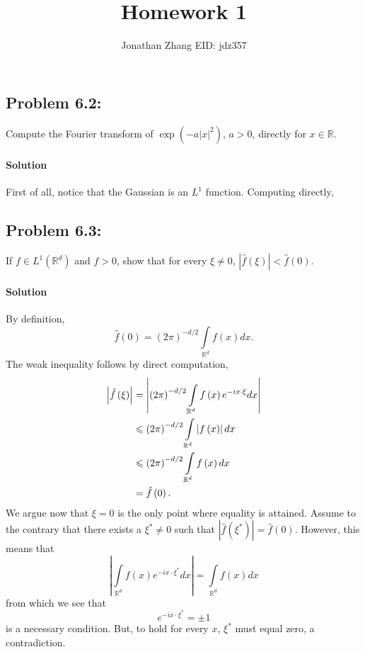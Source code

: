 \documentclass[letterpaper,twoside,11pt]{article}
\theoremstyle{mystyle}
\newcommand{\R}{{\mathbb R}}
\begin{document}
\title{\vspace{-2\baselineskip} 
Homework 1
}
\author{Jonathan Zhang \qquad EID: { jdz357} }
\date{}
\maketitle


\subsection*{Problem 6.2:}
Compute the Fourier transform of $\exp\left( -a| x| ^2 \right)$, $a>0$, directly for $x\in \R$.

\paragraph*{Solution} 
First of all, notice that the Gaussian is an $L^1$ function. 
Computing directly,


\subsection*{Problem 6.3:}
If $f\in L^1\left( \R^d \right)$ and $f>0$, show that for every $\xi\neq 0$, $\left\vert \hat f \left( \xi \right) \right\vert< \hat f\left( 0 \right)$. 

\paragraph*{Solution} By definition, 
\[\hat f\left( 0 \right) = {\left( {2\pi } \right)^{ - d/2}}\int\limits_{{\mathbb{R}^d}} {f\left( x \right)dx} .\]
The weak inequality follows by direct computation, 
\begin{align*}
  \left| {\hat f\left( \xi  \right)} \right| &= \left| {{{\left( {2\pi } \right)}^{ - d/2}}\int\limits_{{\mathbb{R}^d}} {f\left( x \right){e^{ - ix \cdot \xi }}dx} } \right| \hfill \\
   &\leqslant {\left( {2\pi } \right)^{ - d/2}}\int\limits_{{\mathbb{R}^d}} {\left| {f\left( x \right)} \right|dx}  \hfill \\
   &\leqslant {\left( {2\pi } \right)^{ - d/2}}\int\limits_{{\mathbb{R}^d}} {f\left( x \right)dx}  \hfill \\
   &= \hat f\left( 0 \right) .
\end{align*}
  We argue now that $\xi = 0$ is the only point where equality is attained. Assume to the contrary that there exists a $\xi^* \neq 0$ such that $|\hat f\left( \xi^* \right) | = \hat f\left( 0 \right)$. However, this means that 
  \[\left| {\int\limits_{{\mathbb{R}^d}} {f\left( x \right){e^{ - ix \cdot {\xi ^*}}}dx} } \right| = \int\limits_{{\mathbb{R}^d}} {f\left( x \right)dx} \]
  from which we see that 
  \[{e^{ - ix \cdot {\xi ^*}}} =  \pm 1\]
  is a necessary condition. But, to hold for every $x$, $\xi^*$ must equal zero, a contradiction. 
\end{document}

